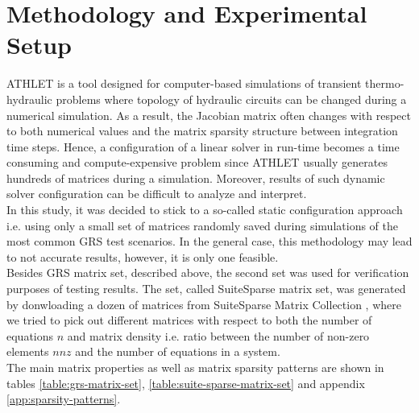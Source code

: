 \chapter{Methodology and Experimental Setup}\label{subseq:matrix-sets-and-hardware}

ATHLET is a tool designed for computer-based simulations of transient thermo-hydraulic problems where topology of hydraulic circuits can be changed during a numerical simulation. As a result, the Jacobian matrix often changes with respect to both numerical values and the matrix sparsity structure between integration time steps. Hence, a configuration of a linear solver in run-time becomes a time consuming and compute-expensive problem since ATHLET usually generates hundreds of matrices during a simulation. Moreover, results of such dynamic solver configuration can be difficult to analyze and interpret.\\


In this study, it was decided to stick to a so-called static configuration approach i.e. using only a small set of matrices randomly saved during simulations of the most common GRS test scenarios. In the general case, this methodology may lead to not accurate results, however, it is only one feasible.\\


Besides GRS matrix set, described above, the second set was  used for verification purposes of testing results. The set, called SuiteSparse matrix set, was generated by donwloading a dozen of matrices from SuiteSparse Matrix Collection \cite{sparse-matrix-collection:1}, \cite{sparse-matrix-collection:2} where we tried to pick out different matrices with respect to both the number of equations $n$ and matrix density i.e. ratio between the number of non-zero elements $nnz$ and the number of equations in a system.\\ 


The main matrix properties as well as matrix sparsity patterns are shown in tables \ref{table:grs-matrix-set}, \ref{table:suite-sparse-matrix-set} and appendix \ref{app:sparsity-patterns}.\\


